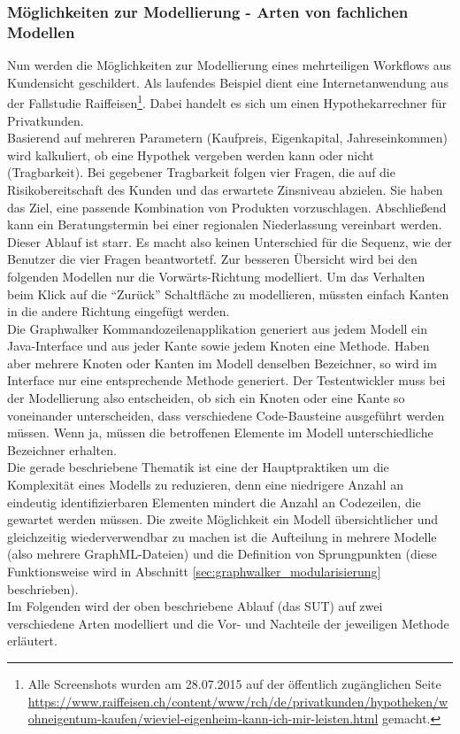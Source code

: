 \subsubsection{Möglichkeiten zur Modellierung - Arten von fachlichen Modellen}
\label{sec:results_modellierung}
Nun werden die Möglichkeiten zur Modellierung eines mehrteiligen Workflows aus Kundensicht geschildert. Als laufendes Beispiel dient eine Internetanwendung aus der Fallstudie Raiffeisen\footnote{Alle Screenshots wurden am 28.07.2015 auf der öffentlich zugänglichen Seite \url{https://www.raiffeisen.ch/content/www/rch/de/privatkunden/hypotheken/wohneigentum-kaufen/wieviel-eigenheim-kann-ich-mir-leisten.html} gemacht.}. Dabei handelt es sich um einen Hypothekarrechner für Privatkunden.\\
Basierend auf mehreren Parametern (Kaufpreis, Eigenkapital, Jahreseinkommen) wird kalkuliert, ob eine Hypothek vergeben werden kann oder nicht (Tragbarkeit). Bei gegebener Tragbarkeit folgen vier Fragen, die auf die Risikobereitschaft des Kunden und das erwartete Zinsniveau abzielen. Sie haben das Ziel, eine passende Kombination von Produkten vorzuschlagen. Abschließend kann ein Beratungstermin bei einer regionalen Niederlassung vereinbart werden.\\
Dieser Ablauf ist starr. Es macht also keinen Unterschied für die Sequenz, wie der Benutzer die vier Fragen beantwortetf. Zur besseren Übersicht wird bei den folgenden Modellen nur die Vorwärts-Richtung modelliert. Um das Verhalten beim Klick auf die ``Zurück'' Schaltfläche zu modellieren, müssten einfach Kanten in die andere Richtung eingefügt werden.\\
Die Graphwalker Kommandozeilenapplikation generiert aus jedem Modell ein Java-Interface und aus jeder Kante sowie jedem Knoten eine Methode. Haben aber mehrere Knoten oder Kanten im Modell denselben Bezeichner, so wird im Interface nur eine entsprechende Methode generiert. Der Testentwickler muss bei der Modellierung also entscheiden, ob sich ein Knoten oder eine Kante so voneinander unterscheiden, dass verschiedene Code-Bausteine ausgeführt werden müssen. Wenn ja, müssen die betroffenen Elemente im Modell unterschiedliche Bezeichner erhalten.\\
Die gerade beschriebene Thematik ist eine der Hauptpraktiken um die Komplexität eines Modells zu reduzieren, denn eine niedrigere Anzahl an eindeutig identifizierbaren Elementen mindert die Anzahl an Codezeilen, die gewartet werden müssen. Die zweite Möglichkeit ein Modell übersichtlicher und gleichzeitig wiederverwendbar zu machen ist die Aufteilung in mehrere Modelle (also mehrere GraphML-Dateien) und die Definition von Sprungpunkten (diese Funktionsweise wird in Abschnitt \ref{sec:graphwalker_modularisierung} beschrieben).\\
Im Folgenden wird der oben beschriebene Ablauf (das \Gls{SUT}) auf zwei verschiedene Arten modelliert und die Vor- und Nachteile der jeweiligen Methode erläutert.


